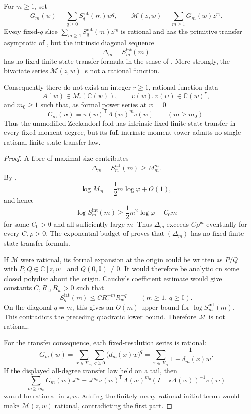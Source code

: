\begin{theorem}
\label{thm:intrinsic-all-degree-transfer-obstruction}
For \(m\ge1\), set
\[
  G_m(w)=\sum_{q\ge0}S_q^{\mathrm{int}}(m)w^q,
  \qquad
  \mathcal M(z,w)=\sum_{m\ge1}G_m(w)z^m.
\]
Every fixed-\(q\) slice
\(\sum_{m\ge1}S_q^{\mathrm{int}}(m)z^m\) is rational and has the primitive
transfer asymptotic of
,
but the intrinsic diagonal sequence
\[
  \Delta_m=S_m^{\mathrm{int}}(m)
\]
has no fixed finite-state transfer formula in the sense of
.  More strongly, the bivariate series
\(\mathcal M(z,w)\) is not a rational function.

Consequently there do not exist an integer \(r\ge1\), rational-function data
\[
  A(w)\in M_r(\mathbb C(w)),
  \qquad u(w),v(w)\in\mathbb C(w)^r,
\]
and \(m_0\ge1\) such that, as formal power series at \(w=0\),
\[
  G_m(w)=u(w)^{\mathsf T}A(w)^m v(w)
  \qquad(m\ge m_0).
\]
Thus the unmodified Zeckendorf fold has intrinsic fixed finite-state transfer in
every fixed moment degree, but its full intrinsic moment tower admits no single
rational finite-state transfer law.
\end{theorem}

\begin{proof}
A fibre of maximal size contributes
\[
  \Delta_m=S_m^{\mathrm{int}}(m)\ge M_m^m.
\]
By ,
\[
  \log M_m=\frac12m\log\varphi+O(1),
\]
and hence
\[
  \log S_m^{\mathrm{int}}(m)
  \ge\frac12m^2\log\varphi-C_0m
\]
for some \(C_0>0\) and all sufficiently large \(m\).  Thus \(\Delta_m\) exceeds
\(C\rho^m\) eventually for every \(C,\rho>0\).  The
exponential budget of  proves that
\((\Delta_m)\) has no fixed finite-state transfer formula.

If \(\mathcal M\) were rational, its formal expansion at the origin could be
written as \(P/Q\) with \(P,Q\in\mathbb C[z,w]\) and \(Q(0,0)\ne0\).  It would
therefore be analytic on some closed polydisc about the origin.  Cauchy's
coefficient estimate would give constants \(C,R_z,R_w>0\) such that
\[
  S_q^{\mathrm{int}}(m)\le C R_z^{-m}R_w^{-q}
  \qquad(m\ge1,\ q\ge0).
\]
On the diagonal \(q=m\), this gives an \(O(m)\) upper bound for
\(\log S_m^{\mathrm{int}}(m)\).
This contradicts the preceding quadratic lower bound.  Therefore
\(\mathcal M\) is not rational.

For the transfer consequence, each fixed-resolution series is rational:
\[
  G_m(w)
  =\sum_{x\in X_m}\sum_{q\ge0}\bigl(d_m(x)w\bigr)^q
  =\sum_{x\in X_m}\frac1{1-d_m(x)w}.
\]
If the displayed all-degree transfer law held on a tail, then
\[
  \sum_{m\ge m_0}G_m(w)z^m
  =z^{m_0}u(w)^{\mathsf T}A(w)^{m_0}
    (I-zA(w))^{-1}v(w)
\]
would be rational in \(z,w\).  Adding the finitely many rational initial
terms would make \(\mathcal M(z,w)\) rational, contradicting the first part.
\end{proof}

